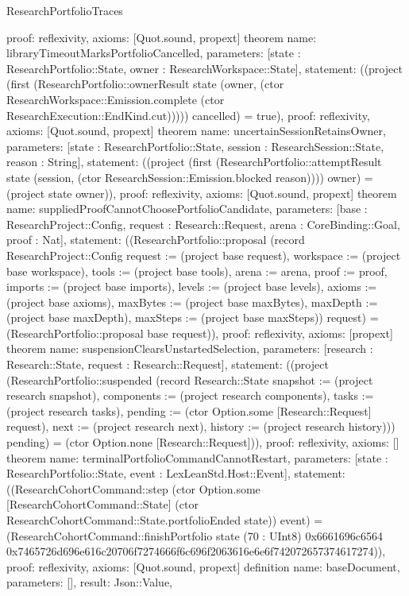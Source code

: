 \begin{lexlean}{ResearchPortfolioTraces}
\begin{semanticmodule}
{ proof: reflexivity{},
 axioms: [Quot.sound, propext]
}
theorem{
 name: libraryTimeoutMarksPortfolioCancelled,
 parameters: [state : ResearchPortfolio::State, owner : ResearchWorkspace::State],
 statement: ((project (first (ResearchPortfolio::ownerResult state (owner, (ctor ResearchWorkspace::Emission.complete (ctor ResearchExecution::EndKind.cut))))) cancelled) = true),
 proof: reflexivity{},
 axioms: [Quot.sound, propext]
}
theorem{
 name: uncertainSessionRetainsOwner,
 parameters: [state : ResearchPortfolio::State, session : ResearchSession::State, reason : String],
 statement: ((project (first (ResearchPortfolio::attemptResult state (session, (ctor ResearchSession::Emission.blocked reason)))) owner) = (project state owner)),
 proof: reflexivity{},
 axioms: [Quot.sound, propext]
}
theorem{
 name: suppliedProofCannotChoosePortfolioCandidate,
 parameters: [base : ResearchProject::Config, request : Research::Request, arena : CoreBinding::Goal, proof : Nat],
 statement: ((ResearchPortfolio::proposal (record ResearchProject::Config {request := (project base request), workspace := (project base workspace), tools := (project base tools), arena := arena, proof := proof, imports := (project base imports), levels := (project base levels), axioms := (project base axioms), maxBytes := (project base maxBytes), maxDepth := (project base maxDepth), maxSteps := (project base maxSteps)}) request) = (ResearchPortfolio::proposal base request)),
 proof: reflexivity{},
 axioms: [propext]
}
theorem{
 name: suspensionClearsUnstartedSelection,
 parameters: [research : Research::State, request : Research::Request],
 statement: ((project (ResearchPortfolio::suspended (record Research::State {snapshot := (project research snapshot), components := (project research components), tasks := (project research tasks), pending := (ctor Option.some [Research::Request] request), next := (project research next), history := (project research history)})) pending) = (ctor Option.none [Research::Request])),
 proof: reflexivity{},
 axioms: []
}
theorem{
 name: terminalPortfolioCommandCannotRestart,
 parameters: [state : ResearchPortfolio::State, event : LexLeanStd.Host::Event],
 statement: ((ResearchCohortCommand::step (ctor Option.some [ResearchCohortCommand::State] (ctor ResearchCohortCommand::State.portfolioEnded state)) event) = (ResearchCohortCommand::finishPortfolio state (70 : UInt8) 0x6661696c6564 0x7465726d696e616c20706f7274666f6c696f2063616e6e6f742072657374617274)),
 proof: reflexivity{},
 axioms: [Quot.sound, propext]
}
definition{
 name: baseDocument,
 parameters: [],
 result: Json::Value,
}
\end{semanticmodule}
\end{lexlean}
